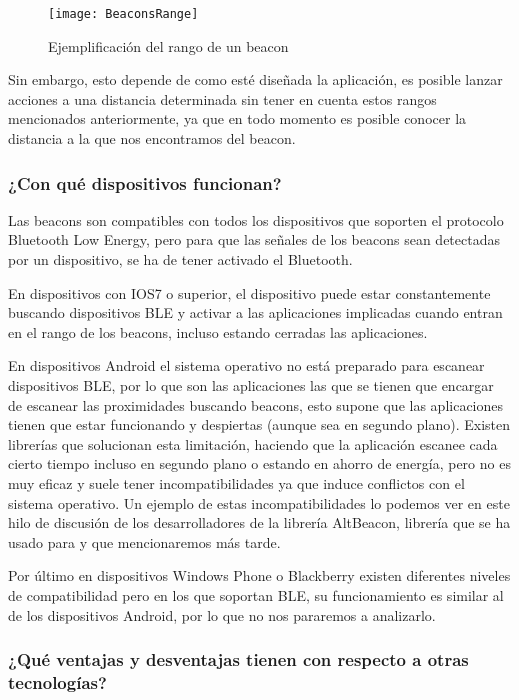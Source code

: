 \begin{figure}[h]
	\centering
	\texttt{[image: BeaconsRange]}
	\caption{Ejemplificación del rango de un beacon}
	\label{fig:beaconRange}
\end{figure}

Sin embargo, esto depende de como esté diseñada la aplicación, es posible lanzar acciones a una distancia determinada sin tener en cuenta estos rangos mencionados anteriormente, ya que en todo momento es posible conocer la distancia a la que nos encontramos del beacon.

\subsubsection{¿Con qué dispositivos funcionan?}

Las beacons son compatibles con todos los dispositivos que soporten el protocolo Bluetooth Low Energy, pero para que las señales de los beacons sean detectadas por un dispositivo, se ha de tener activado el Bluetooth. 


En dispositivos con IOS7 \cite{URL::IOS7} o superior, el dispositivo puede estar constantemente buscando dispositivos BLE y activar a las aplicaciones implicadas cuando entran en el rango de los beacons, incluso estando cerradas las aplicaciones.


En dispositivos Android \cite{URL::Android} el sistema operativo no está preparado para escanear dispositivos BLE, por lo que son las aplicaciones las que se tienen que encargar de escanear las proximidades buscando beacons, esto supone que las aplicaciones tienen que estar funcionando y despiertas (aunque sea en segundo plano). Existen librerías que solucionan esta limitación, haciendo que la aplicación escanee cada cierto tiempo incluso en segundo plano o estando en ahorro de energía, pero no es muy eficaz y suele tener incompatibilidades ya que induce conflictos con el sistema operativo. Un ejemplo de estas incompatibilidades lo podemos ver en este hilo de discusión \cite{URL::Incompatibilidades} de los desarrolladores de la librería AltBeacon, librería que se ha usado para \BulletPoint{} y que mencionaremos más tarde.

Por último en dispositivos Windows Phone \cite{URL:WindowsPhone} o Blackberry \cite{URL:Blackberry} existen diferentes niveles de compatibilidad pero en los que soportan BLE, su funcionamiento es similar al de los dispositivos Android, por lo que no nos pararemos a analizarlo. 

\subsubsection{¿Qué ventajas y desventajas tienen con respecto a otras tecnologías?}

